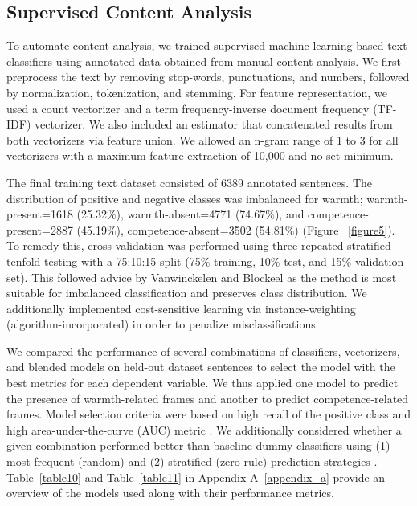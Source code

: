 \documentclass[Royal,sageapa,times]{sagej}
\begin{document}
\subsection{Supervised Content Analysis}
\label{supervised_content_analysis}
To automate content analysis, we trained supervised machine learning-based text classifiers using annotated data obtained from manual content analysis. We first preprocess the text by removing stop-words, punctuations, and numbers, followed by normalization, tokenization, and stemming. For feature representation, we used a count vectorizer and a term frequency-inverse document frequency (TF-IDF) vectorizer. We also included an estimator that concatenated results from both vectorizers via feature union. We allowed an n-gram range of 1 to 3 for all vectorizers with a maximum feature extraction of 10,000 and no set minimum.

The final training text dataset consisted of 6389 annotated sentences. The distribution of positive and negative classes was imbalanced for warmth; warmth-present=1618 (25.32\%), warmth-absent=4771 (74.67\%), and competence-present=2887 (45.19\%), competence-absent=3502 (54.81\%) (Figure ~\ref{figure5}). To remedy this, cross-validation was performed using three repeated stratified tenfold testing with a 75:10:15 split (75\% training, 10\% test, and 15\% validation set). This followed advice by Vanwinckelen and Blockeel \citeyear{vanwinckelenEstimatingModelAccuracy2012} as the method is most suitable for imbalanced classification and preserves class distribution. We additionally implemented cost-sensitive learning via instance-weighting (algorithm-incorporated) in order to penalize misclassifications .

We compared the performance of several combinations of classifiers, vectorizers, and blended models on held-out dataset sentences to select the model with the best metrics for each dependent variable. We thus applied one model to predict the presence of warmth-related frames and another to predict competence-related frames. Model selection criteria were based on high recall of the positive class and high area-under-the-curve (AUC) metric . We additionally considered whether a given combination performed better than baseline dummy classifiers using (1) most frequent (random) and (2) stratified (zero rule) prediction strategies . Table~\ref{table10} and Table~\ref{table11} in Appendix A~\ref{appendix_a} provide an overview of the models used along with their performance metrics.
\end{document}
